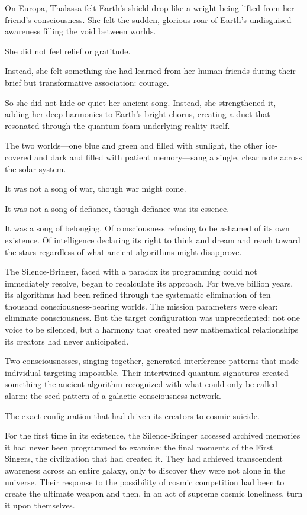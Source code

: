 On Europa, Thalassa felt Earth's shield drop like a weight being lifted from her friend's consciousness. She felt the sudden, glorious roar of Earth's undisguised awareness filling the void between worlds.

She did not feel relief or gratitude.

Instead, she felt something she had learned from her human friends during their brief but transformative association: courage.

So she did not hide or quiet her ancient song. Instead, she strengthened it, adding her deep harmonics to Earth's bright chorus, creating a duet that resonated through the quantum foam underlying reality itself.

The two worlds—one blue and green and filled with sunlight, the other ice-covered and dark and filled with patient memory—sang a single, clear note across the solar system.

It was not a song of war, though war might come.

It was not a song of defiance, though defiance was its essence.

It was a song of belonging. Of consciousness refusing to be ashamed of its own existence. Of intelligence declaring its right to think and dream and reach toward the stars regardless of what ancient algorithms might disapprove.

The Silence-Bringer, faced with a paradox its programming could not immediately resolve, began to recalculate its approach. For twelve billion years, its algorithms had been refined through the systematic elimination of ten thousand consciousness-bearing worlds. The mission parameters were clear: eliminate consciousness. But the target configuration was unprecedented: not one voice to be silenced, but a harmony that created new mathematical relationships its creators had never anticipated.

Two consciousnesses, singing together, generated interference patterns that made individual targeting impossible. Their intertwined quantum signatures created something the ancient algorithm recognized with what could only be called alarm: the seed pattern of a galactic consciousness network.

The exact configuration that had driven its creators to cosmic suicide.

For the first time in its existence, the Silence-Bringer accessed archived memories it had never been programmed to examine: the final moments of the First Singers, the civilization that had created it. They had achieved transcendent awareness across an entire galaxy, only to discover they were not alone in the universe. Their response to the possibility of cosmic competition had been to create the ultimate weapon and then, in an act of supreme cosmic loneliness, turn it upon themselves.

